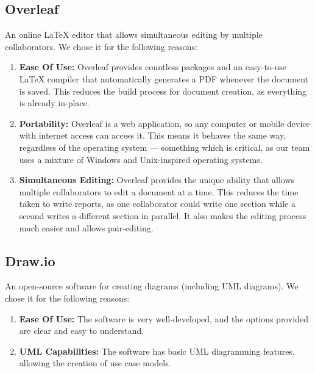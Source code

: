 \documentclass[11pt,onside]{report}
\begin{document}
\subsection{Overleaf} 

An online LaTeX editor that allows simultaneous editing by multiple collaborators. We chose it for the following reasons:

\begin{enumerate}
    \item \textbf{Ease Of Use:} Overleaf provides countless packages and an easy-to-use LaTeX compiler that automatically generates a PDF whenever the document is saved. This reduces the build process for document creation, as everything is already in-place.
    
    \item \textbf{Portability:} Overleaf is a web application, so any computer or mobile device with internet access can access it. This means it behaves the same way, regardless of the operating system — something which is critical, as our team uses a mixture of Windows and Unix-inspired operating systems.
    
    \item \textbf{Simultaneous Editing:} Overleaf provides the unique ability that allows multiple collaborators to edit a document at a time. This reduces the time taken to write reports, as one collaborator could write one section while a second writes a different section in parallel. It also makes the editing process much easier and allows pair-editing.
    
\end{enumerate}

\subsection{Draw.io} 

An open-source software for creating diagrams (including UML diagrams). We chose it for the following reasons:

\begin{enumerate}
    \item \textbf{Ease Of Use:} The software is very well-developed, and the options provided are clear and easy to understand.
    
    \item \textbf{UML Capabilities:} The software has basic UML diagramming features, allowing the creation of use case models.
\end{enumerate}
\end{document}
